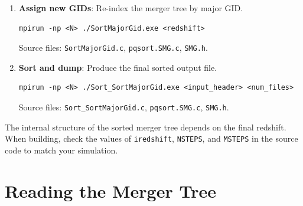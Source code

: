 \documentclass[11pt,fleqn]{book}
\newcommand{\code}[1]{\texttt{#1}}
\newcommand{\file}[1]{\texttt{#1}}
\begin{document}
\begin{algorithm}
\begin{enumerate}[leftmargin=2em]
  \item \textbf{Assign new GIDs}: Re-index the merger tree by major GID.
\begin{lstlisting}[style=bash,numbers=none]
mpirun -np <N> ./SortMajorGid.exe <redshift>
\end{lstlisting}
  Source files: \file{SortMajorGid.c}, \file{pqsort.SMG.c}, \file{SMG.h}.

  \item \textbf{Sort and dump}: Produce the final sorted output file.
\begin{lstlisting}[style=bash,numbers=none]
mpirun -np <N> ./Sort_SortMajorGid.exe <input_header> <num_files>
\end{lstlisting}
  Source files: \file{Sort\_SortMajorGid.c}, \file{pqsort.SMG.c}, \file{SMG.h}.
\end{enumerate}
\end{algorithm}

\begin{remark}
The internal structure of the sorted merger tree depends on the final redshift.  When building, check the values of \code{iredshift}, \code{NSTEPS}, and \code{MSTEPS} in the source code to match your simulation.
\end{remark}

\section{Reading the Merger Tree}
\end{document}
